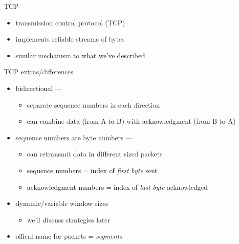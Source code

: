 \usetikzlibrary{patterns}
\begin{frame}{TCP}
    \begin{itemize}
    \item transmission control protocol (TCP)
    \item implements reliable streams of bytes
    \item similar mechanism to what we've described
    \end{itemize}
\end{frame}

\begin{frame}{TCP extras/differences}
    \begin{itemize}
    \item bidirectional ---
        \begin{itemize}
        \item separate sequence numbers in each direction
        \item can combine data (from A to B) with acknowledgment (from B to A)
        \end{itemize}
    \item sequence numbers are byte numbers ---
        \begin{itemize}
        \item can retransmit data in different sized packets
        \item sequence numbers = index of \textit{first byte} sent
        \item acknowledgment numbers = index of \textit{last byte} acknowledged
        \end{itemize}
    \item dynamic/variable window sizes
        \begin{itemize}
        \item we'll discuss strategies later
        \end{itemize}
    \item offical name for packets = \textit{segments}
    \end{itemize}
\end{frame}

